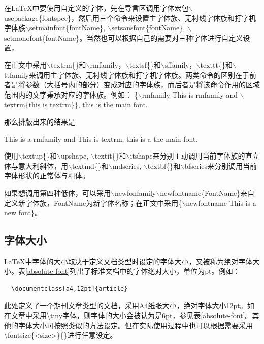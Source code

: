 \documentclass[12pt]{book}
\begin{document}
在\LaTeX{}中要使用自定义的字体，先在导言区调用字体宏包$\backslash$usepackage\{fontspec\}，然后用三个命令来设置主字体族、无衬线字体族和打字机字体族$\backslash$setmainfont\{fontName\}, $\backslash$setsansfont\{fontName\}, $\backslash$setmonofont\{fontName\}。当然也可以根据自己的需要对三种字体进行自定义设置，


在正文中采用$\backslash$textrm\{\}和$\backslash$rmfamily，$\backslash$textsf\{\}和$\backslash$sffamily，$\backslash$texttt\{\}和$\backslash$ttfamily来调用主字体族、无衬线字体族和打字机字体族。两类命令的区别在于前者是将参数（大括号内的部分）变成对应的字体族，而后者是将该命令作用的区域范围内的文字秉承对应的字体族。例如：
\{$\backslash$rmfamily This is rmfamily and $\backslash$textrm\{this is textrm\}\}, this is the main font.

那么排版出来的结果是

{\rmfamily This is a rmfamily and \textrm{This is textrm}}, this is a the main font. %


使用$\backslash$textup\{\}和$\backslash$upshape, $\backslash$textit\{\}和$\backslash$itshape来分别主动调用当前字体族的直立体与意大利斜体，用$\backslash$textmd\{\}和$\backslash$mdseries, $\backslash$textbf\{\}和$\backslash$bfseries来分别调用当前字体形状的正常体与粗体。

如果想调用第四种低体，可以采用$\backslash$newfonfamily$\backslash$newfontname\{FontName\}来自定义新字体族，FontName为新字体名称；在正文中采用\{$\backslash$newfontname This is a new font\}。

\subsection{字体大小}

\LaTeX{}中字体的大小取决于定义文档类型时设定的字体大小，又被称为绝对字体大小。表\ref{absolute-font}列出了标准文档中的字体绝对大小，单位为pt。例如：
\begin{verbatim}
  \documentclass[a4,12pt]{article} 
\end{verbatim}
此处定义了一个期刊文章类型的文档，采用A4纸张大小，绝对字体大小12pt。如在文章中采用\textbackslash tiny字体，则字体的大小会被认为是6pt，参见表\ref{absolute-font}。其他的字体大小可按照类似的方法设定。但在实际使用过程中也可以根据需要采用\textbackslash fontsize\{<size>\}\{<base line-skip>\}进行任意设定。
\end{document}
